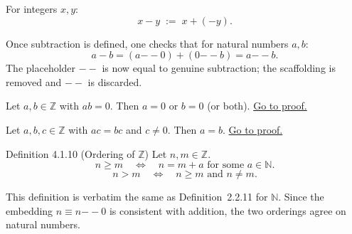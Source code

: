 \begin{definition}[Subtraction]
\label{def:int-subtraction}
For integers $x, y$:
\[
x - y \;:=\; x + (-y).
\]
\end{definition}

\begin{remark*}
Once subtraction is defined, one checks that for natural numbers
$a, b$:
\[
a - b = (a {-\!\!-} 0) + (0 {-\!\!-} b) = a {-\!\!-} b.
\]
The placeholder $--$ is now equal to genuine subtraction; the
scaffolding is removed and $--$ is discarded.
\end{remark*}

\begin{proposition}
\label{prop:int-no-zero-div}
Let $a, b \in \mathbb{Z}$ with $ab = 0$. Then $a = 0$ or $b = 0$ (or both).
\hyperref[prf:int-no-zero-div]{Go to proof.}
\end{proposition}

\begin{corollary}
\label{cor:int-cancel}
Let $a, b, c \in \mathbb{Z}$ with $ac = bc$ and $c \neq 0$. Then $a = b$.
\hyperref[prf:int-cancel]{Go to proof.}
\end{corollary}

\begin{propositionbox}{Definition 4.1.10 (Ordering of $\mathbb{Z}$)}
Let $n, m \in \mathbb{Z}$.
\[
n \geq m \quad\iff\quad n = m + a \text{ for some } a \in \mathbb{N}.
\]
\[
n > m \quad\iff\quad n \geq m \text{ and } n \neq m.
\]
\end{propositionbox}

\begin{remark*}
This definition is verbatim the same as Definition~2.2.11 for $\mathbb{N}$.
Since the embedding $n \equiv n {-\!\!-} 0$ is consistent with addition,
the two orderings agree on natural numbers.
\end{remark*}

